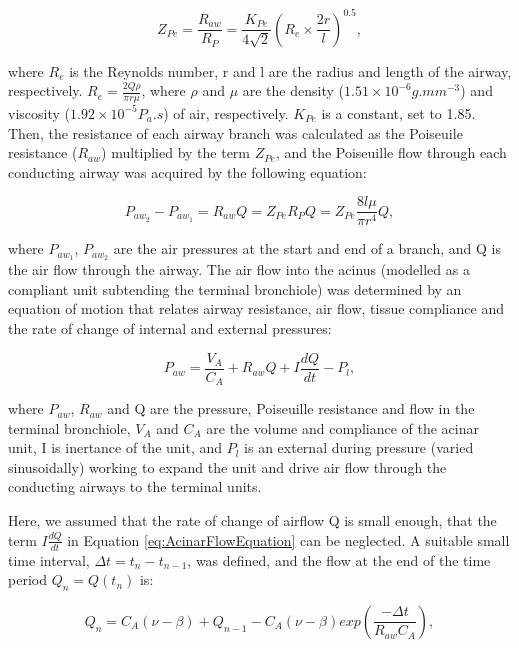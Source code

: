 \begin{equation}
 \label{eq:EnergyDissipation}
 Z_{Pe} = \frac{R_{aw}}{R_P} = \frac{K_{Pe}}{4\sqrt{2}}(R_e \times \frac{2r}{l})^{0.5},
\end{equation}

\noindent where $R_e$ is the Reynolds number, r and l are the radius and length of the airway, respectively. $R_e = \frac{2Q\rho}{\pi r \mu}$, where $\rho$ and $\mu$ are the density ($1.51 \times 10^{-6}g.mm^{-3}$) and viscosity ($1.92 \times 10^{-5}P_{a}.s$) of air, respectively. $K_{Pe}$ is a constant, set to 1.85. Then, the resistance of each airway branch was calculated as the Poiseuile resistance ($R_{aw}$) multiplied by the term $Z_{Pe}$, and the Poiseuille flow through each conducting airway was acquired by the following equation:

\begin{equation}
 \label{eq:PressureFlowEquation}
 P_{aw_2} - P_{aw_1} = R_{aw}Q = Z_{Pe}R_PQ = Z_{Pe}\frac{8l\mu}{\pi r^{4}}Q,
\end{equation}

\noindent where $P_{aw_1}$, $P_{aw_2}$ are the air pressures at the start and end of a branch, and Q is the air flow through the airway. The air flow into the acinus (modelled as a compliant unit subtending the terminal bronchiole) was determined by an equation of motion that relates airway resistance, air flow, tissue compliance and the rate of change of internal and external pressures:

\begin{equation}
 \label{eq:AcinarFlowEquation}
 P_{aw} = \frac{V_A}{C_A} + R_{aw}Q + I\frac{dQ}{dt} - P_l,
\end{equation}

\noindent where $P_{aw}$, $R_{aw}$ and Q are the pressure, Poiseuille resistance and flow in the terminal bronchiole, $V_A$ and $C_A$ are the volume and compliance of the acinar unit, I is inertance of the unit, and $P_l$ is an external during pressure (varied sinusoidally) working to expand the unit and drive air flow through the conducting airways to the terminal units.

Here, we assumed that the rate of change of airflow Q is small enough, that the term $I\frac{dQ}{dt}$ in Equation \ref{eq:AcinarFlowEquation} can be neglected. A suitable small time interval, $\Delta t = t_n - t_{n-1}$, was defined, and the flow at the end of the time period $Q_n = Q(t_n)$ is:

\begin{equation}
 \label{eq:FlowRespectToTime}
 Q_n = C_A(\nu - \beta) + Q_{n-1} - C_A(\nu - \beta)exp(\frac{-\Delta t}{R_{aw}C_A}),
\end{equation}

